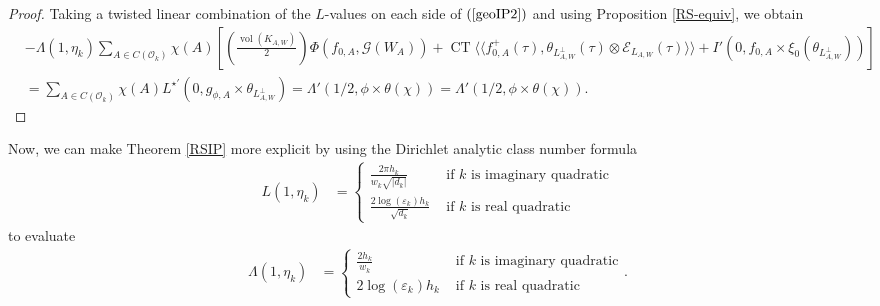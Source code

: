 \documentclass{amsart}
\theoremstyle{definition}
\theoremstyle{definition}
\theoremstyle{definition}
\begin{document}
\begin{proof}
Taking a twisted linear combination of the $L$-values on each side of $(\ref{geoIP2})$ and using Proposition \ref{RS-equiv}, we obtain 
\begin{equation} \begin{aligned}\label{geoIP3} 
&- \Lambda(1, \eta_k) \sum\limits_{A \in C(\mathcal{O}_k)} \chi(A) \left[ \left( \frac{ \operatorname{vol}(K_{A,W})  }{ 2 } \right) \Phi(f_{0, A}, \mathcal{G}(W_A)) 
+ \operatorname{CT} \langle \langle f_{0, A}^+(\tau), \theta_{L_{A, W}^{\perp}}(\tau) \otimes \mathcal{E}_{L_{A, W}}(\tau) \rangle \rangle 
+ I'(0, f_{0,A} \times \xi_0(\theta_{L_{A,W}^{\perp}})) \right] \\
&= \sum\limits_{A \in C(\mathcal{O}_k)} \chi(A) L^{\star \prime}(0, g_{\phi, A} \times \theta_{L_{A, W}^{\perp}})
= \Lambda'(1/2, \phi \times \theta(\chi)) = \Lambda'(1/2, \phi \times \theta(\chi)). \end{aligned}\end{equation} \end{proof}

Now, we can make Theorem \ref{RSIP} more explicit by using the Dirichlet analytic class number formula 
\begin{align}\label{Dirichlet} L(1, \eta_k) &= \begin{cases} \frac{2 \pi h_k}{w_k \sqrt{\vert d_k \vert}} &\text{ if $k$ is imaginary quadratic} \\
\frac{2 \log(\varepsilon_k) h_k}{\sqrt{d_k}} &\text{ if $k$ is real quadratic} \end{cases} \end{align}
to evaluate 
\begin{align}\label{CDirichlet} \Lambda(1, \eta_k) 
&= \begin{cases} \frac{2 h_k}{w_k} &\text{ if $k$ is imaginary quadratic} \\ 2 \log(\varepsilon_k) h_k &\text{ if $k$ is real quadratic} \end{cases}.\end{align}
\end{document}
